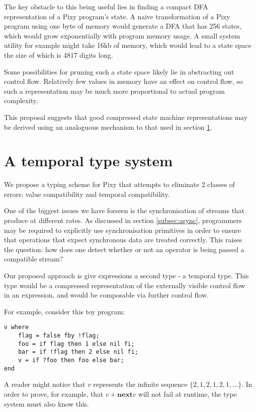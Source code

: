 \documentclass{scrartcl}
\begin{document}
    The key obstacle to this being useful lies in finding a compact DFA representation of a Pixy program's state. A naive transformation of a Pixy program using one byte of memory would generate a DFA that has 256 states, which would grow exponentially with program memory usage. A small system utility for example might take 16kb of memory, which would lead to a state space the size of which is 4817 digits long.
    
    Some possibilities for pruning such a state space likely lie in abstracting out control flow. Relatively few values in memory have an effect on control flow, so such a representation may be much more proportional to actual program complexity.
    
    This proposal suggests that good compressed state machine representations may be derived using an analoguous mechanism to that used in section \ref{sec:temporaltypesystem}.
    
    \section{A temporal type system}
    
    \label{sec:temporaltypesystem}
    
    We propose a typing scheme for Pixy that attempts to eliminate 2 classes of errors: value compatibility and temporal compatibility.
    
    One of the biggest issues we have forseen is the synchronisation of streams that produce at different rates. As discussed in section \ref{subsec:async}, programmers may be required to explicitly use synchronisation primitives in order to ensure that operations that expect synchronous data are treated correctly. This raises the question: how does one detect whether or not an operator is being passed a compatible stream?
    
    Our proposed approach is give expressions a second type - a temporal type. This type would be a compressed representation of the externally visible control flow in an expression, and would be composable via further control flow.
    
    For example, consider this toy program:
    \begin{lstlisting}
v where
    flag = false fby !flag;
    foo = if flag then 1 else nil fi;
    bar = if !flag then 2 else nil fi;
    v = if ?foo then foo else bar;
end
    \end{lstlisting}
    
    A reader might notice that $v$ represents the infinite sequence $\{2,1,2,1,2,1,\dots\}$. In order to prove, for example, that $v + \textbf{next} v$ will not fail at runtime, the type system must also know this.
    
\end{document}
